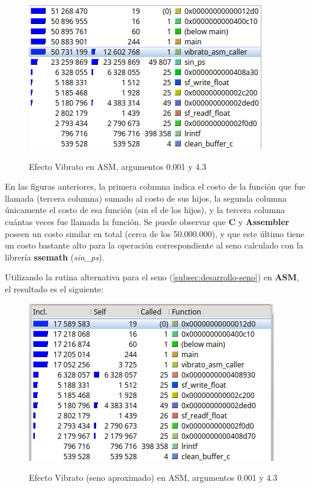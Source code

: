 \begin{figure}[H]
    \centering
    \includegraphics[scale=0.8]{imagenes/callgrind-asm.png}
    \label{fig:callgrind-asm-26788}
    \caption{Efecto Vibrato en ASM, argumentos 0.001 y 4.3}
\end{figure}

En las figuras anteriores, la primera columna indica el costo de la función que fue llamada (tercera columna) sumado al costo de sus hijos, la segunda columna únicamente el costo de esa función (sin el de los hijos), y la tercera columna cuántas veces fue llamada la función. Se puede observar que \textbf{C} y \textbf{Assembler} poseen un costo similar en total (cerca de los 50.000.000), y que este último tiene un costo bastante alto para la operación correspondiente al seno calculado con la librería \textbf{ssemath} (\textit{sin\_ps}).

Utilizando la rutina alternativa para el seno (\ref{subsec:desarrollo-seno}) en \textbf{ASM}, el resultado es el siguiente:

\begin{figure}[H]
    \centering
    \includegraphics[scale=0.8]{imagenes/callgrind-asm-seno-approx.png}
    \label{fig:callgrind-asm-27462}
    \caption{Efecto Vibrato (seno aproximado) en ASM, argumentos 0.001 y 4.3}
\end{figure}

